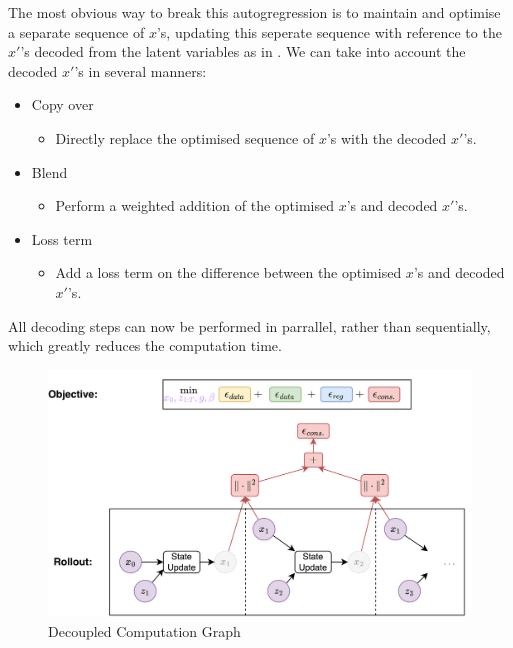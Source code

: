 The most obvious way to break this autogregression is to maintain and optimise a separate sequence of $x$'s, updating this seperate sequence with reference to the $x'$'s decoded from the latent variables as in . We can take into account the decoded $x'$'s in several manners:
\begin{itemize}
    \item Copy over
    \begin{itemize}
        \item Directly replace the optimised sequence of $x$'s with the decoded $x'$'s.
    \end{itemize}
    \item Blend
    \begin{itemize}
        \item Perform a weighted addition of the optimised $x$'s and decoded $x'$'s.
    \end{itemize}
    \item Loss term
    \begin{itemize}
        \item Add a loss term on the difference between the optimised $x$'s and decoded $x'$'s. 
    \end{itemize}
\end{itemize}

All decoding steps can now be performed in parrallel, rather than sequentially, which greatly reduces the computation time. 

\begin{figure}[!ht]
    \centering
    \includegraphics[width=1\textwidth]{Figures/humor/improvement/computation_graph_dimm.png}
    \caption{Decoupled Computation Graph}
    \label{fig:dimm_rollout_graph}
\end{figure}

